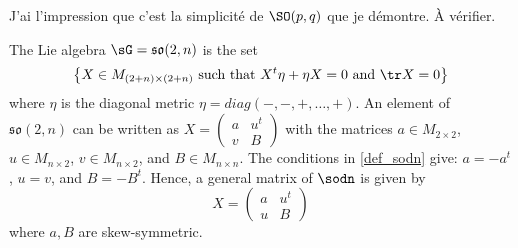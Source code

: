 \begin{probleme}
	J'ai l'impression que c'est la simplicité de $\SO(p,q)$ que je démontre. À vérifier.
\end{probleme}

The Lie algebra $\sG=\mathfrak{so}(2,n)$ is the set
\begin{equation}\label{def_sodn}
	\big\{X\in M_{(2+n)\times (2+n)}\textrm{ such that }X^t\eta+\eta X=0\textrm{ and } \tr X=0\big\}
\end{equation}
where $\eta$ is the diagonal metric $\eta=diag(-,-,+,\ldots,+)$. An element of $\mathfrak{so}(2,n)$ can be written as
$
	X=\begin{pmatrix}
		a & u ^t \\
		v & B
	\end{pmatrix}
$
with the matrices $a\in M_{2\times 2}$, $u\in M_{n\times 2}$, $v\in M_{n\times 2}$, and $B\in M_{n\times n}$. The conditions in \eqref{def_sodn} give: $a=-a^t$, $u=v$, and $B=-B^t$. Hence, a general matrix of $\sodn$ is given by
\begin{equation}	\label{eq:gene_sodn}
	X=\begin{pmatrix}
		a & u^t \\
		u & B
	\end{pmatrix}
\end{equation}
where $a,B$ are skew-symmetric.

